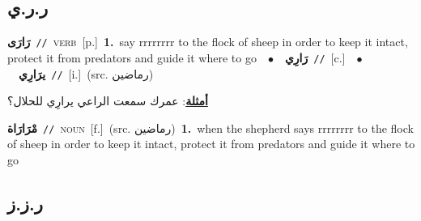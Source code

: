 \documentclass[10pt,a4paper,twoside]{article} %
\begin{document}
\begin{multicols}{2}
\vspace{-3mm}
\subsection*{\color{blue}\foreignlanguage{arabic}{ر.ر.ي}\color{blue}{ (ntws)}} 

{\setlength\topsep{0pt}\textbf{\foreignlanguage{arabic}{رَارَى}}\ {\color{gray}\texttt{//}\color{black}}\ \textsc{verb}\ [p.]\ \textbf{1.}~say rrrrrrrr to the flock of sheep in order to keep it intact, protect it from predators and guide it where to go\ \ $\bullet$\ \ \setlength\topsep{0pt}\textbf{\foreignlanguage{arabic}{رَارِي}}\ {\color{gray}\texttt{//}\color{black}}\ [c.]\ \ $\bullet$\ \ \setlength\topsep{0pt}\textbf{\foreignlanguage{arabic}{يرَارِي}}\ {\color{gray}\texttt{//}\color{black}}\ [i.]\ (src. \color{gray}\foreignlanguage{arabic}{رماضين}\color{black})\  \begin{flushright}\color{gray}\foreignlanguage{arabic}{\textbf{\underline{\foreignlanguage{arabic}{أمثلة}}}: عمرك سمعت الراعي يرارِي للحلال؟}\end{flushright}\color{black}} \vspace{2mm}

{\setlength\topsep{0pt}\textbf{\foreignlanguage{arabic}{مْرَارَاة}}\ {\color{gray}\texttt{//}\color{black}}\ \textsc{noun}\ [f.]\ (src. \color{gray}\foreignlanguage{arabic}{رماضين}\color{black})\ \textbf{1.}~when the shepherd says rrrrrrrr to the flock of sheep in order to keep it intact, protect it from predators and guide it where to go\ } \vspace{2mm}

\vspace{-3mm}
\subsection*{\color{blue}\foreignlanguage{arabic}{ر.ز.ز}\color{blue}{}} 


\end{multicols}
\end{document}
